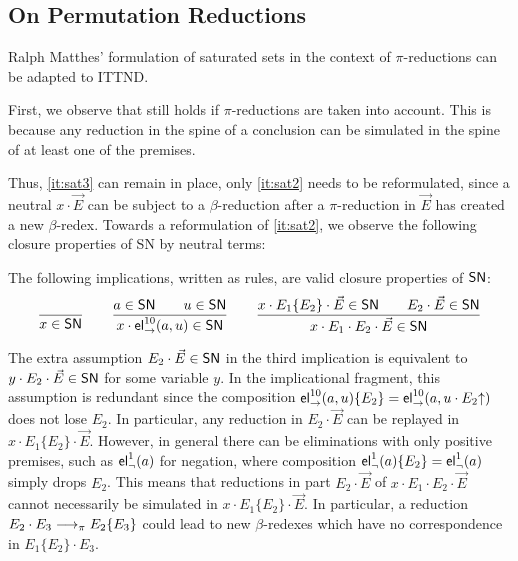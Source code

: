 \subsection{On Permutation Reductions}
\label{sec:sat-perm}

Ralph Matthes' \cite{matthes:classlog} formulation of saturated sets in
the context of $\pi$-reductions can be adapted to ITTND.

First, we observe that  still holds if
$\pi$-reductions are taken into account.  This is because any
reduction in the spine of a conclusion can be simulated in the spine
of at least one of the premises.

Thus, \ref{it:sat3} can remain in place, only \ref{it:sat2} needs to
be reformulated, since a neutral $x \cdot \vec E$ can be subject to a
$\beta$-reduction after a $\pi$-reduction in $\vec E$ has created a
new $\beta$-redex.  Towards a reformulation of \ref{it:sat2}, we
observe the following closure properties of SN by neutral terms:
\begin{lemma}
  \label{lem:clos-ne}
  The following implications, written as rules, are valid closure
  properties of $\SN$:
\begin{gather*}
  \ru{}{x \in \SN}
\qquad
  \ru{a \in \SN \qquad u \in \SN
    }{x \cdot \el\to{10}(a,u) \in \SN}
\qquad
  \ru{x \cdot E_1\{E_2\} \cdot \vec E \in \SN \qquad
      E_2 \cdot \vec E \in \SN
    }{x \cdot E_1 \cdot E_2 \cdot \vec E \in \SN}
\end{gather*}
\end{lemma}
The extra assumption $E_2 \cdot \vec E \in \SN$ in the third
implication is equivalent to $y \cdot E_2 \cdot \vec E \in \SN$ for
some variable $y$.
In the implicational fragment, this assumption is
redundant since the composition $\el\to{10}(a,u)\{E_2\} =
\el\to{10}(a,u \cdot E_2\up)$ does not lose $E_2$.
In particular, any reduction in $E_2 \cdot \vec E$ can be replayed in
$x \cdot E_1\{E_2\} \cdot \vec E$.
However, in general there can be eliminations with only
positive premises, such as $\el\neg{1}(a)$ for negation, where composition
$\el\neg{1}(a)\{E_2\} = \el\neg{1}(a)$ simply drops $E_2$.
This means that reductions in part $E_2 \cdot \vec E$ of
$x \cdot E_1 \cdot E_2 \cdot \vec E$ cannot necessarily be simulated
in $x \cdot E_1\{E_2\} \cdot \vec E$.  In particular, a reduction $E_2
\cdot E_3 \red[\pi] E_2\{E_3\}$ could lead to new $\beta$-redexes which
have no correspondence in $E_1\{E_2\} \cdot E_3$.

\newcommand{\rvar}{\rulename{var}}
\newcommand{\rel}{\rulename{el}}
\newcommand{\rpi}{\rulename{pi}}

